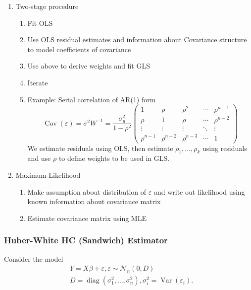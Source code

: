 \documentclass[11pt, %
	oneside, %
	english, %
	onehalfspacing, %
	]{article} %
\numberwithin{equation}{section}
\begin{document}
\begin{enumerate}
    \item Two-stage procedure
    \begin{enumerate}
        \item Fit OLS
        \item Use OLS residual estimates and information about Covariance structure to model coefficients of covariance
        \item Use above to derive weights and fit GLS
        \item Iterate
        \item Example: Serial correlation of AR(1) form
        \begin{equation*}
            \operatorname{Cov}(\varepsilon)=\sigma^2 W^{-1}=\frac{\sigma_u^2}{1-\rho^2}\left(\begin{array}{ccccc}
                1 & \rho & \rho^2 & \cdots & \rho^{n-1} \\
                \rho & 1 & \rho & \cdots & \rho^{n-2} \\
                \vdots & \vdots & \vdots & \ddots & \vdots \\
                \rho^{n-1} & \rho^{n-2} & \rho^{n-3} & \cdots & 1
                \end{array}\right)
        \end{equation*}
        We estimate residuals using OLS, then estimate $\rho_1, ..., \rho_k$ using residuals and use $\rho$ to define weights to be used in GLS.
    \end{enumerate}
    \item Maximum-Likelihood
    \begin{enumerate}
        \item Make assumption about distribution of $\varepsilon$ and write out likelihood using known information about covariance matrix
        \item Estimate covariance matrix using MLE
    \end{enumerate}
\end{enumerate}


\subsubsection*{Huber-White HC (Sandwich) Estimator}

Consider the model
$$
\begin{aligned}
& Y=X \beta+\varepsilon, \varepsilon \sim \mathcal{N}_n(0, D) \\
& D=\operatorname{diag}\left(\sigma_1^2, \ldots, \sigma_n^2\right), \sigma_i^2=\operatorname{Var}\left(\varepsilon_i\right).
\end{aligned}
$$
\end{document}

